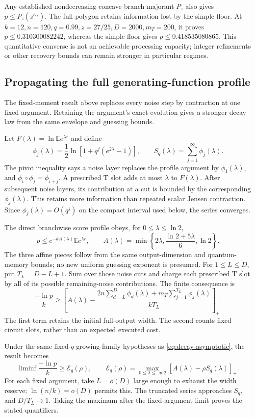 \documentclass[11pt,a4paper]{article}
\numberwithin{equation}{section}
\theoremstyle{remark}\newtheorem*{remark}{Interpretation}
\newcommand{\E}{\mathbb E}
\begin{document}
Any established nondecreasing concave branch majorant $P_z$ also gives $p\le P_z(z^{U_z})$. The full polygon retains information lost by the simple floor. At $k=12,n=120,q=0.99,z=27/25,D=2000,m_T=200$, it proves $p\le0.310300082242$, whereas the simple floor gives $p\le0.418535080865$. This quantitative converse is not an achievable processing capacity; integer refinements or other recovery bounds can remain stronger in particular regimes.

\subsection{Propagating the full generating-function profile}
The fixed-moment result above replaces every noise step by contraction at one fixed argument. Retaining the argument's exact evolution gives a stronger decay law from the same envelope and guessing bounds.

Let $F(\lambda)=\ln\E e^{\lambda r}$ and define
\[
\phi_j(\lambda)=\frac12\ln\left[1+q^j(e^{2\lambda}-1)\right],
\qquad S_q(\lambda)=\sum_{j=1}^{\infty}\phi_j(\lambda).
\]
The pivot inequality says a noise layer replaces the profile argument by $\phi_1(\lambda)$, and $\phi_i\circ\phi_j=\phi_{i+j}$. A prescribed T slot adds at most $\lambda$ to $F(\lambda)$. After subsequent noise layers, its contribution at a cut is bounded by the corresponding $\phi_j(\lambda)$. This retains more information than repeated scalar Jensen contraction. Since $\phi_j(\lambda)=O(q^j)$ on the compact interval used below, the series converges.

The direct branchwise score profile obeys, for $0\le\lambda\le\ln2$,
\[
p\le e^{-kA(\lambda)}\E e^{\lambda r},\qquad
A(\lambda)=\min\left\{2\lambda,\frac{\ln2+5\lambda}{6},\ln2\right\}.
\]
The three affine pieces follow from the same output-dimension and quantum-memory bounds; no new uniform guessing exponent is presumed. For $1\le L\le D$, put $T_L=D-L+1$. Sum over those noise cuts and charge each prescribed T slot by all of its possible remaining-noise contributions. The finite consequence is
\[
\frac{-\ln p}{k}\ge
\left[A(\lambda)-
\frac{2n\sum_{d=L}^{D}\phi_d(\lambda)
+m_T\sum_{j=1}^{T_L}\phi_j(\lambda)}{kT_L}\right]_+.
\]
The first term retains the initial full-output width. The second counts fixed circuit slots, rather than an expected executed cost.

Under the same fixed-$q$ growing-family hypotheses as \eqref{eq:decay-asymptotic}, the result becomes
\begin{equation}
\boxed{\liminf\frac{-\ln p}{k}\ge\mathcal E_q(\rho),\qquad
\mathcal E_q(\rho)=
\max_{0\le\lambda\le\ln2}
[A(\lambda)-\rho S_q(\lambda)]_+.}
\label{eq:full-profile-exponent}
\end{equation}
For each fixed argument, take $L=o(D)$ large enough to exhaust the width reserve; $\ln(n/k)=o(D)$ permits this. The truncated series approaches $S_q$, and $D/T_L\to1$. Taking the maximum after the fixed-argument limit proves the stated quantifiers.
\end{document}
